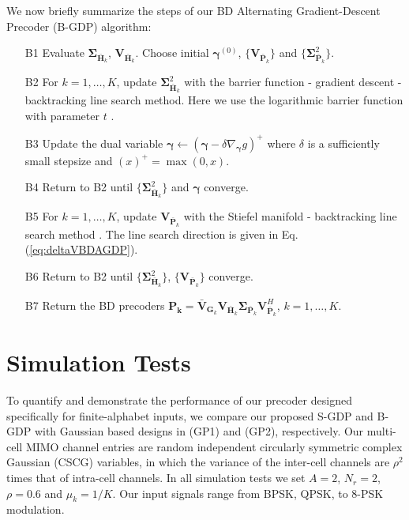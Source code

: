 \documentclass{article}
\begin{document}
    We now briefly summarize the steps of our BD Alternating Gradient-Descent Precoder (B-GDP) algorithm:

  \begin{enumerate}\itemsep0pt\parskip0pt
        \item[B1] Evaluate $\mathbf{\Sigma}_{\bar{\mathbf{H}}_k}$, $\mathbf{V}_{\bar{\mathbf{H}}_k}$. Choose initial $\bm{\gamma}^{(0)}$, $\{\mathbf{V}_{\bar{\mathbf{P}}_k}\}$ and $\{\mathbf{\Sigma}_{\bar{\mathbf{P}}_k}^2\}$.
        \item[B2] For $k=1,\ldots,K$, update $\mathbf{\Sigma}_{\bar{\mathbf{H}}_k}^2$ with the barrier function - gradient descent -
        backtracking line search method. Here we use the logarithmic barrier function with parameter $t$ \cite{zeng2012linearrelay}.
        \item[B3] Update the dual variable $\bm{\gamma} \leftarrow (\bm{\gamma}-\delta\nabla_{\bm{\gamma}}g)^+$ where $\delta$ is a sufficiently small stepsize and $(x)^+=\max(0,x)$.        \item[B4] Return to B2 until $\{\mathbf{\Sigma}_{\bar{\mathbf{H}}_k}^2\}$ and $\bm{\gamma}$ converge.
        \item[B5] For $k=1,\ldots,K$, update $\mathbf{V}_{\bar{\mathbf{P}}_k}$ with the Stiefel manifold - backtracking line search method \cite{zeng2012linearrelay}. The line search direction is given in Eq. (\ref{eq:deltaVBDAGDP}).
        \item[B6] Return to B2 until $\{\mathbf{\Sigma}_{\bar{\mathbf{H}}_k}^2\}$, $\{\mathbf{V}_{\bar{\mathbf{P}}_k}\}$ converge.
        \item[B7] Return the BD precoders $\mathbf{P_k} = \bar{\mathbf{V}}_{\mathbf{G}_k}\mathbf{V}_{\bar{\mathbf{H}}_k}\mathbf{\Sigma}_{\bar{\mathbf{P}}_k}\mathbf{V}_{\bar{\mathbf{P}}_k}^H$, $k=1,\ldots,K$.
 \end{enumerate}

\vspace*{-3mm}

\section{Simulation Tests}
\label{sec:simu}
\vspace*{-2mm}

To quantify and demonstrate the performance of our precoder designed specifically for finite-alphabet inputs,
we compare our proposed S-GDP and B-GDP
with Gaussian based designs in \cite{fritzsche2013robust} (GP1) and \cite{zhang2010cooperative} (GP2), respectively.
Our multi-cell MIMO channel entries are random independent circularly symmetric complex Gaussian (CSCG)
variables, in which the variance of the inter-cell channels are $\rho^2$ times that of intra-cell channels.
In all simulation tests we set
$A=2$, $N_r = 2$, $\rho=0.6$ and $\mu_k=1/K$.
Our input signals range from BPSK, QPSK, to  8-PSK modulation.
\end{document}

